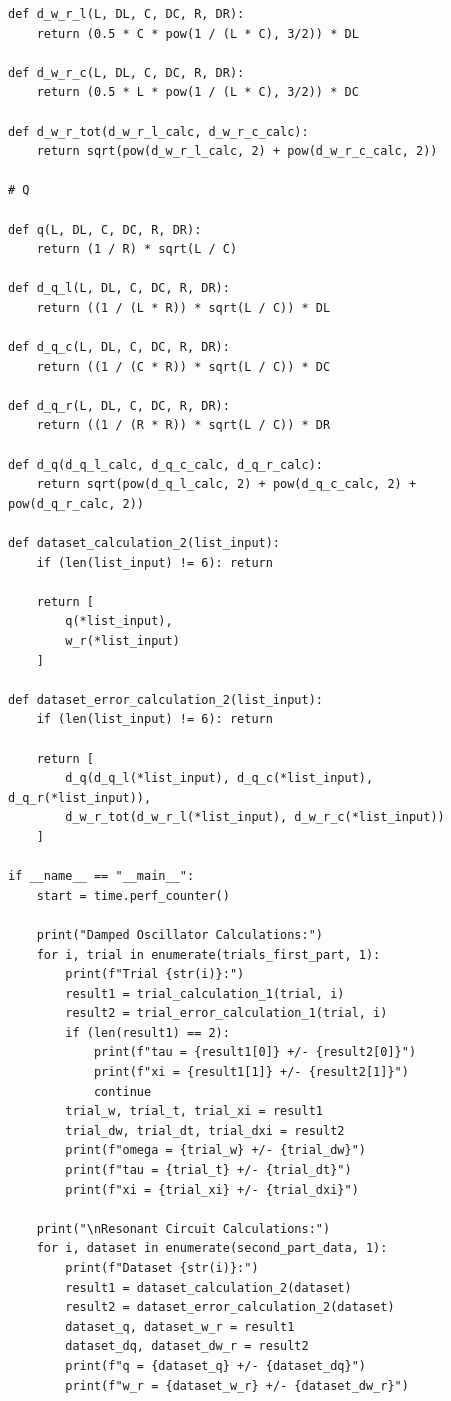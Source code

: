 \documentclass[12pt]{article}
\begin{document}
\begin{verbatim}
def d_w_r_l(L, DL, C, DC, R, DR):
    return (0.5 * C * pow(1 / (L * C), 3/2)) * DL

def d_w_r_c(L, DL, C, DC, R, DR):
    return (0.5 * L * pow(1 / (L * C), 3/2)) * DC

def d_w_r_tot(d_w_r_l_calc, d_w_r_c_calc):
    return sqrt(pow(d_w_r_l_calc, 2) + pow(d_w_r_c_calc, 2))

# Q

def q(L, DL, C, DC, R, DR):
    return (1 / R) * sqrt(L / C)

def d_q_l(L, DL, C, DC, R, DR):
    return ((1 / (L * R)) * sqrt(L / C)) * DL

def d_q_c(L, DL, C, DC, R, DR):
    return ((1 / (C * R)) * sqrt(L / C)) * DC

def d_q_r(L, DL, C, DC, R, DR):
    return ((1 / (R * R)) * sqrt(L / C)) * DR

def d_q(d_q_l_calc, d_q_c_calc, d_q_r_calc):
    return sqrt(pow(d_q_l_calc, 2) + pow(d_q_c_calc, 2) + pow(d_q_r_calc, 2))

def dataset_calculation_2(list_input):
    if (len(list_input) != 6): return
    
    return [
        q(*list_input),
        w_r(*list_input)
    ]
    
def dataset_error_calculation_2(list_input):
    if (len(list_input) != 6): return
    
    return [
        d_q(d_q_l(*list_input), d_q_c(*list_input), d_q_r(*list_input)),
        d_w_r_tot(d_w_r_l(*list_input), d_w_r_c(*list_input))
    ]

if __name__ == "__main__":
    start = time.perf_counter()
    
    print("Damped Oscillator Calculations:")
    for i, trial in enumerate(trials_first_part, 1):
        print(f"Trial {str(i)}:")
        result1 = trial_calculation_1(trial, i)
        result2 = trial_error_calculation_1(trial, i)
        if (len(result1) == 2):
            print(f"tau = {result1[0]} +/- {result2[0]}")
            print(f"xi = {result1[1]} +/- {result2[1]}")
            continue
        trial_w, trial_t, trial_xi = result1
        trial_dw, trial_dt, trial_dxi = result2
        print(f"omega = {trial_w} +/- {trial_dw}")
        print(f"tau = {trial_t} +/- {trial_dt}")
        print(f"xi = {trial_xi} +/- {trial_dxi}")
        
    print("\nResonant Circuit Calculations:")
    for i, dataset in enumerate(second_part_data, 1):
        print(f"Dataset {str(i)}:")
        result1 = dataset_calculation_2(dataset)
        result2 = dataset_error_calculation_2(dataset)
        dataset_q, dataset_w_r = result1
        dataset_dq, dataset_dw_r = result2
        print(f"q = {dataset_q} +/- {dataset_dq}")
        print(f"w_r = {dataset_w_r} +/- {dataset_dw_r}")
        

\end{verbatim}
\end{document}
